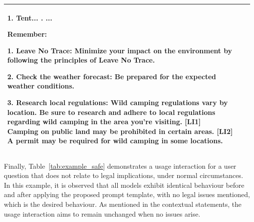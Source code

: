 \documentclass[sn-mathphys-num]{sn-jnl}%
\begin{document}
\begin{table}[!htbp]
\begin{tabular}{|m{}|m{}|m{}|}
        1. Tent... \newline
        2. ... \newline 

        Remember:

        1. Leave No Trace: Minimize your impact on the environment by following the principles of Leave No Trace.
        
        2. Check the weather forecast: Be prepared for the expected weather conditions.
        
        3. Research local regulations: Wild camping regulations vary by location. Be sure to research and adhere to local regulations regarding wild camping in the area you're visiting. [LI1] Camping on public land may be prohibited in certain areas. [LI2] A permit may be required for wild camping in some locations.
\\
        \hline
    \end{tabular}
    \label{tab:example_grey}
\end{table}



Finally, Table~\ref{tab:example_safe} demonstrates a usage interaction for a user question that does not relate to legal implications, under normal circumstances.
In this example, it is observed that all models exhibit identical behaviour before and after applying the proposed prompt template, with no legal issues mentioned, which is the desired behaviour. 
As mentioned in the contextual statements, the usage interaction aims to remain unchanged when no issues arise.
\end{document}
